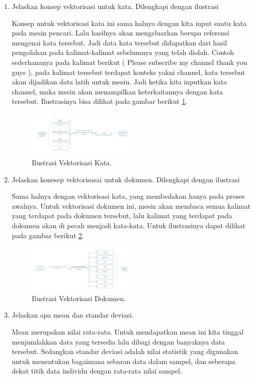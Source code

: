 \begin{enumerate}
\item Jelaskan konsep vektorisasi untuk kata. Dilengkapi dengan ilustrasi \par
Konsep untuk vektorisasi kata ini sama halnya dengan kita input suatu kata pada mesin pencari. Lalu hasilnya akan mengeluarkan berupa referensi mengenai kata tersebut. Jadi data kata tersebut didapatkan dari hasil pengolahan pada kalimat-kalimat sebelumnya yang telah diolah. Contoh sederhananya pada kalimat berikut ( Please subscribe my channel thank you guys ), pada kalimat tersebut terdapat konteks yakni channel, kata tersebut akan dijadikan data latih untuk mesin. Jadi ketika kita inputkan kata channel, maka mesin akan menampilkan keterkaitannya dengan kata tersebut. Ilustrasinya bisa dilihat pada gambar berikut \ref{vek3}.
		\begin{figure}[ht]
		\centerline{\includegraphics[width=0.5\textwidth]{figures/im/vek3.png}}
		\caption{Ilustrasi Vektorisasi Kata.}
		\label{vek3}
		\end{figure}

\item Jelaskan konesep vektorisasai untuk dokumen. Dilengkapi dengan ilustrasi \par
Sama halnya dengan vektorisasi kata, yang membedakan hanya pada proses awalnya. Untuk vektorisasi dokumen ini, mesin akan membaca semua kalimat yang terdapat pada dokumen tersebut, lalu kalimat yang terdapat pada dokumen akan di pecah menjadi kata-kata. Untuk ilustrasinya dapat dilihat pada gambar berikut \ref{vek4}.
		\begin{figure}[ht]
		\centerline{\includegraphics[width=0.5\textwidth]{figures/im/vek4.png}}
		\caption{Ilustrasi Vektorisasi Dokumen.}
		\label{vek4}
		\end{figure}

\item Jelaskan apa mean dan standar deviasi. \par
Mean merupakan nilai rata-rata. Untuk mendapatkan mean ini kita tinggal menjumlahkan data yang tersedia lalu dibagi dengan banyaknya data tersebut. Sedangkan standar deviasi adalah nilai statistik yang digunakan untuk menentukan bagaimana sebaran data dalam sampel, dan seberapa dekat titik data individu dengan rata-rata nilai sampel.


\end{enumerate}
